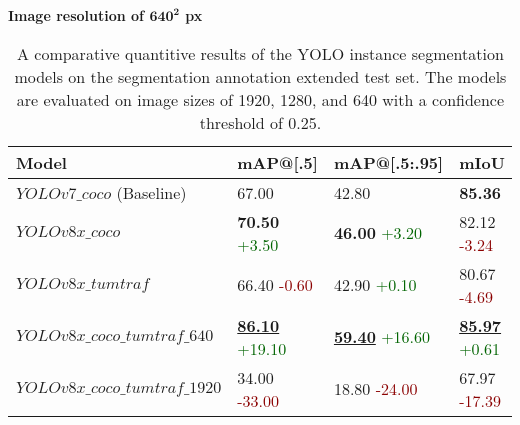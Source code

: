 \begin{table}[htb]
	\begin{minipage}{\textwidth}
		\centering
		\textbf{Image resolution of $\bm{640^2}$ px} \\
		\begin{tabular}{llll}
			\toprule
			\textbf{Model} & \textbf{mAP@[.5]} & \textbf{mAP@[.5:.95]} & \textbf{mIoU} \\
			\midrule
			$YOLOv7\_coco$ (Baseline) & 67.00 & 42.80 & \textbf{85.36}\\
			$YOLOv8x\_coco$ & \textbf{70.50} \scriptsize\textcolor{darkgreen}{+3.50} & \textbf{46.00} \scriptsize\textcolor{darkgreen}{+3.20} & 82.12 \scriptsize\textcolor{darkred}{-3.24}\\
			$YOLOv8x\_tumtraf$& 66.40 \scriptsize\textcolor{darkred}{-0.60} & 42.90 \scriptsize\textcolor{darkgreen}{+0.10} & 80.67 \scriptsize\textcolor{darkred}{-4.69}\\
			$YOLOv8x\_coco\_tumtraf\_640$ & \textbf{\underline{86.10}} \scriptsize\textcolor{darkgreen}{+19.10} & \textbf{\underline{59.40}} \scriptsize\textcolor{darkgreen}{+16.60} & \textbf{\underline{85.97}} \scriptsize\textcolor{darkgreen}{+0.61} \\
			$YOLOv8x\_coco\_tumtraf\_1920$   & 34.00 \scriptsize\textcolor{darkred}{-33.00} & 18.80 \scriptsize\textcolor{darkred}{-24.00} & 67.97 \scriptsize\textcolor{darkred}{-17.39} \\
			\bottomrule
		\end{tabular}
	\end{minipage}
	\caption{A comparative quantitive results of the YOLO instance segmentation models on the segmentation annotation extended test set. The models are evaluated on image sizes of 1920, 1280, and 640 with a confidence threshold of 0.25.}
	\label{tab:2d_quantitative_yolo}%
\end{table}

